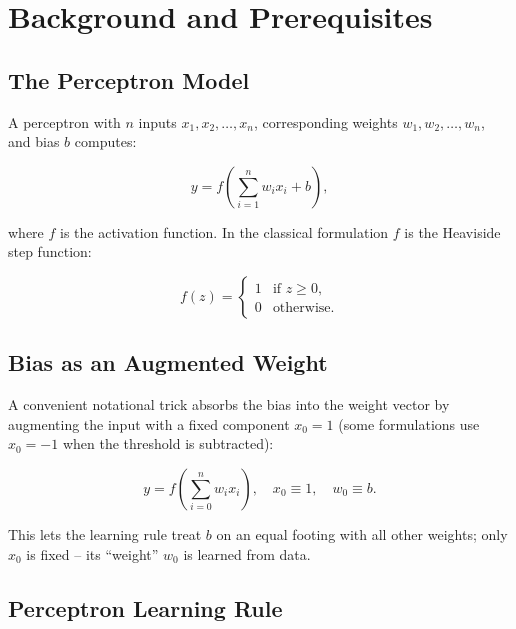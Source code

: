 \documentclass[12pt,a4paper]{article}
\begin{document}
\section{Background and Prerequisites}
\label{sec:prereqs}

\subsection{The Perceptron Model}
\label{subsec:perceptron-model}

A perceptron with $n$ inputs $x_1, x_2, \ldots, x_n$, corresponding
weights $w_1, w_2, \ldots, w_n$, and bias $b$ computes:

\begin{equation}
  \label{eq:perceptron}
  y = f\!\left(\sum_{i=1}^{n} w_i x_i + b\right),
\end{equation}

where $f$ is the activation function.  In the classical formulation
$f$ is the Heaviside step function:

\begin{equation}
  \label{eq:step}
  f(z) =
  \begin{cases}
    1 & \text{if } z \geq 0, \\
    0 & \text{otherwise.}
  \end{cases}
\end{equation}

\subsection{Bias as an Augmented Weight}
\label{subsec:bias-weight}

A convenient notational trick absorbs the bias into the weight vector by
augmenting the input with a fixed component $x_0 = 1$ (some formulations
use $x_0 = -1$ when the threshold is subtracted):

\begin{equation}
  \label{eq:augmented}
  y = f\!\left(\sum_{i=0}^{n} w_i x_i\right), \quad x_0 \equiv 1,
  \quad w_0 \equiv b.
\end{equation}

This lets the learning rule treat $b$ on an equal footing with all other
weights; only $x_0$ is fixed -- its ``weight'' $w_0$ is learned from data.

\subsection{Perceptron Learning Rule}
\label{subsec:learning-rule}
\end{document}
